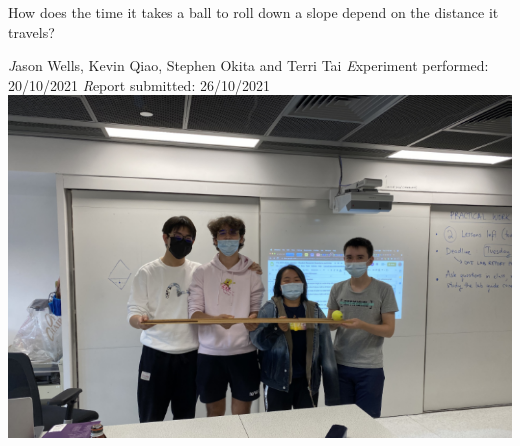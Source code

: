 \documentclass[12pt]{report}
\begin{document}
\begin{center}
    {\Large How does the time it takes a ball to roll down a slope depend on the distance it travels?}

    \vspace{1cm}
    {\emph Jason Wells, Kevin Qiao, Stephen Okita and Terri Tai}\newline
    {\emph Experiment performed: 20/10/2021}\newline
    {\emph Report submitted: 26/10/2021}
    \vspace{2cm}
    \includegraphics[width=\textwidth]{Img.png}

\end{center}
\tableofcontents
\end{document}
